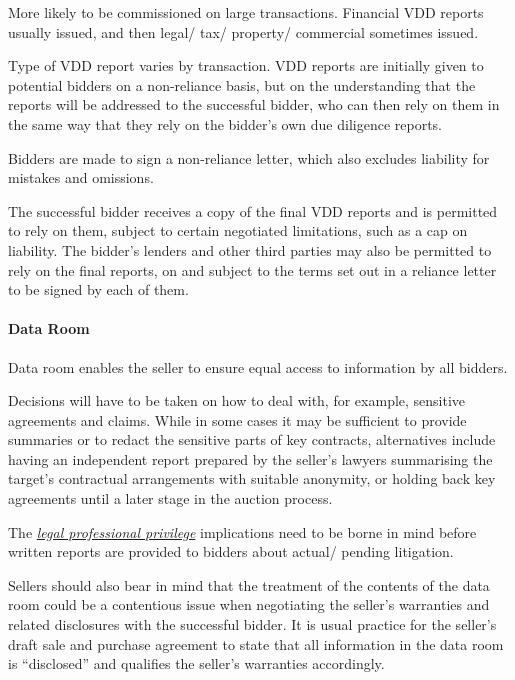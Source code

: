 \documentclass[
]{article}
\begin{document}
More likely to be commissioned on large transactions. Financial VDD
reports usually issued, and then legal/ tax/ property/ commercial
sometimes issued.

Type of VDD report varies by transaction. VDD reports are initially
given to potential bidders on a non-reliance basis, but on the
understanding that the reports will be addressed to the successful
bidder, who can then rely on them in the same way that they rely on the
bidder's own due diligence reports.

Bidders are made to sign a non-reliance letter, which also excludes
liability for mistakes and omissions.

The successful bidder receives a copy of the final VDD reports and is
permitted to rely on them, subject to certain negotiated limitations,
such as a cap on liability. The bidder's lenders and other third parties
may also be permitted to rely on the final reports, on and subject to
the terms set out in a reliance letter to be signed by each of them.

\hypertarget{data-room}{%
\paragraph{Data Room}\label{data-room}}

Data room enables the seller to ensure equal access to information by
all bidders.

Decisions will have to be taken on how to deal with, for example,
sensitive agreements and claims. While in some cases it may be
sufficient to provide summaries or to redact the sensitive parts of key
contracts, alternatives include having an independent report prepared by
the seller's lawyers summarising the target's contractual arrangements
with suitable anonymity, or holding back key agreements until a later
stage in the auction process.

The
\emph{\href{https://uk.practicallaw.thomsonreuters.com/4-107-6756?originationContext=document\&transitionType=DocumentItem\&contextData=(sc.Default)\&ppcid=e6c4099f36904665b8e4b53211f9bb58}{legal
professional privilege}} implications need to be borne in mind before
written reports are provided to bidders about actual/ pending
litigation.

Sellers should also bear in mind that the treatment of the contents of
the data room could be a contentious issue when negotiating the seller's
warranties and related disclosures with the successful bidder. It is
usual practice for the seller's draft sale and purchase agreement to
state that all information in the data room is ``disclosed'' and
qualifies the seller's warranties accordingly.
\end{document}
